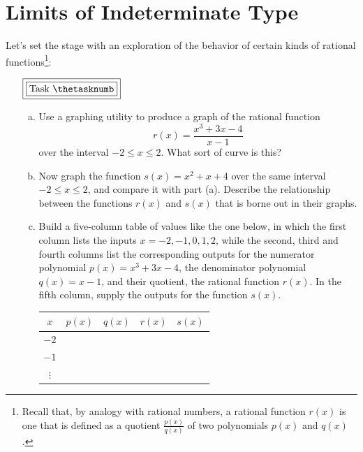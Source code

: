\message{ !name(LHopitalsRule_2021.03.29.tex)}\documentclass[11pt]{article}
\newcounter{tasknumb}
\newcommand{\tasknumb}[1]{\refstepcounter{tasknumb}\textmd{\textbf{$\fbox{$\fbox{Task \thetasknumb}$}$}}#1}
\newenvironment{task}[1][]%
 {\begin{itemize}
 \item[\tasknumb{#1}] }
{
    \end{itemize}    }%
\begin{document}
\newpage
\section{Limits of Indeterminate Type}

Let's set the stage with an exploration of the behavior of certain kinds of rational functions\footnote{Recall that, by analogy with rational numbers, a rational function $r(x)$ is one that is defined as a quotient $\frac{p(x)}{q(x)}$ of two polynomials $p(x)$ and $q(x)$.}:

\begin{task}[\label{factorable}]
\begin{enumerate}[(a)] \itemsep -8pt
\item Use a graphing utility to produce a graph of the rational function $$r(x)=\frac{x^3+3x-4}{x-1}$$over the interval $-2 \le x \le 2$. What sort of curve is this? \\
\item Now graph the function $s(x)=x^2+x+4$ over the same interval $-2 \le x \le 2$, and compare it with part (a). Describe the relationship between the functions $r(x)$ and $s(x)$ that is borne out in their graphs. \\
\item Build a five-column table of values like the one below, in which the first column lists the inputs $x=-2, -1, 0, 1, 2$, while the second, third and fourth columns list the corresponding outputs for the numerator polynomial $p(x)=x^3+3x-4$, the denominator polynomial $q(x)=x-1$, and their quotient, the rational function $r(x)$. %
In the fifth column, supply the outputs for the function $s(x)$. 

\begin{center}
\begin{tabularx}{0.75\textwidth}{c|CCC|C}
$x$ & $p(x)$ & $q(x)$ & $r(x)$ & $s(x)$ \\ \hline
$-2$ &&&& \\
$-1$ &&&& \\
$\vdots$ &&&&
\end{tabularx}
\end{center}
\bigskip


\end{enumerate}
\end{task}
\end{document}
